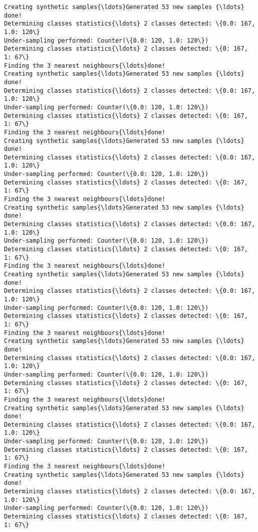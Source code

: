 \documentclass{article}
\begin{document}
\begin{Verbatim}[commandchars=\\\{\}]
Creating synthetic samples{\ldots}Generated 53 new samples {\ldots}
done!
Determining classes statistics{\ldots} 2 classes detected: \{0.0: 167, 1.0: 120\}
Under-sampling performed: Counter(\{0.0: 120, 1.0: 120\})
Determining classes statistics{\ldots} 2 classes detected: \{0: 167, 1: 67\}
Finding the 3 nearest neighbours{\ldots}done!
Creating synthetic samples{\ldots}Generated 53 new samples {\ldots}
done!
Determining classes statistics{\ldots} 2 classes detected: \{0.0: 167, 1.0: 120\}
Under-sampling performed: Counter(\{0.0: 120, 1.0: 120\})
Determining classes statistics{\ldots} 2 classes detected: \{0: 167, 1: 67\}
Finding the 3 nearest neighbours{\ldots}done!
Creating synthetic samples{\ldots}Generated 53 new samples {\ldots}
done!
Determining classes statistics{\ldots} 2 classes detected: \{0.0: 167, 1.0: 120\}
Under-sampling performed: Counter(\{0.0: 120, 1.0: 120\})
Determining classes statistics{\ldots} 2 classes detected: \{0: 167, 1: 67\}
Finding the 3 nearest neighbours{\ldots}done!
Creating synthetic samples{\ldots}Generated 53 new samples {\ldots}
done!
Determining classes statistics{\ldots} 2 classes detected: \{0.0: 167, 1.0: 120\}
Under-sampling performed: Counter(\{0.0: 120, 1.0: 120\})
Determining classes statistics{\ldots} 2 classes detected: \{0: 167, 1: 67\}
Finding the 3 nearest neighbours{\ldots}done!
Creating synthetic samples{\ldots}Generated 53 new samples {\ldots}
done!
Determining classes statistics{\ldots} 2 classes detected: \{0.0: 167, 1.0: 120\}
Under-sampling performed: Counter(\{0.0: 120, 1.0: 120\})
Determining classes statistics{\ldots} 2 classes detected: \{0: 167, 1: 67\}
Finding the 3 nearest neighbours{\ldots}done!
Creating synthetic samples{\ldots}Generated 53 new samples {\ldots}
done!
Determining classes statistics{\ldots} 2 classes detected: \{0.0: 167, 1.0: 120\}
Under-sampling performed: Counter(\{0.0: 120, 1.0: 120\})
Determining classes statistics{\ldots} 2 classes detected: \{0: 167, 1: 67\}
Finding the 3 nearest neighbours{\ldots}done!
Creating synthetic samples{\ldots}Generated 53 new samples {\ldots}
done!
Determining classes statistics{\ldots} 2 classes detected: \{0.0: 167, 1.0: 120\}
Under-sampling performed: Counter(\{0.0: 120, 1.0: 120\})
Determining classes statistics{\ldots} 2 classes detected: \{0: 167, 1: 67\}
Finding the 3 nearest neighbours{\ldots}done!
Creating synthetic samples{\ldots}Generated 53 new samples {\ldots}
done!
Determining classes statistics{\ldots} 2 classes detected: \{0.0: 167, 1.0: 120\}
Under-sampling performed: Counter(\{0.0: 120, 1.0: 120\})
Determining classes statistics{\ldots} 2 classes detected: \{0: 167, 1: 67\}

\end{Verbatim}
\end{document}
